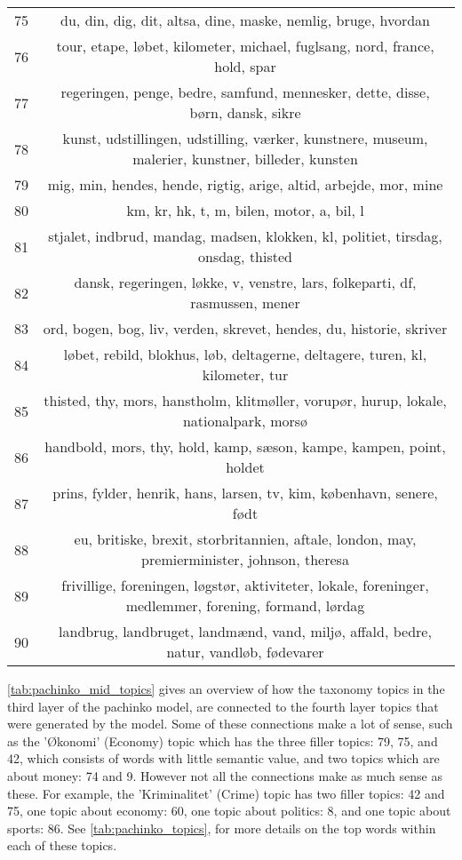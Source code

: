 \begin{longtable}[c]{c | c}
		75 & du, din, dig, dit, altsa, dine, maske, nemlig, bruge, hvordan \\
		76 & tour, etape, løbet, kilometer, michael, fuglsang, nord, france, hold, spar \\
		77 & regeringen, penge, bedre, samfund, mennesker, dette, disse, børn, dansk, sikre \\
		78 & kunst, udstillingen, udstilling, værker, kunstnere, museum, malerier, kunstner, billeder, kunsten \\
		79 & mig, min, hendes, hende, rigtig, arige, altid, arbejde, mor, mine \\
		80 & km, kr, hk, t, m, bilen, motor, a, bil, l \\
		81 & stjalet, indbrud, mandag, madsen, klokken, kl, politiet, tirsdag, onsdag, thisted \\
		82 & dansk, regeringen, løkke, v, venstre, lars, folkeparti, df, rasmussen, mener \\
		83 & ord, bogen, bog, liv, verden, skrevet, hendes, du, historie, skriver \\
		84 & løbet, rebild, blokhus, løb, deltagerne, deltagere, turen, kl, kilometer, tur \\
		85 & thisted, thy, mors, hanstholm, klitmøller, vorupør, hurup, lokale, nationalpark, morsø \\
		86 & handbold, mors, thy, hold, kamp, sæson, kampe, kampen, point, holdet \\
		87 & prins, fylder, henrik, hans, larsen, tv, kim, københavn, senere, født \\
		88 & eu, britiske, brexit, storbritannien, aftale, london, may, premierminister, johnson, theresa \\
		89 & frivillige, foreningen, løgstør, aktiviteter, lokale, foreninger, medlemmer, forening, formand, lørdag \\
		90 & landbrug, landbruget, landmænd, vand, miljø, affald, bedre, natur, vandløb, fødevarer \\
\end{longtable}

\autoref{tab:pachinko_mid_topics} gives an overview of how the taxonomy topics in the third layer of the pachinko model, are connected to the fourth layer topics that were generated by the model.
Some of these connections make a lot of sense, such as the 'Økonomi' (Economy) topic which has the three filler topics: 79, 75, and 42, which consists of words with little semantic value, and two topics which are about money: 74 and 9.
However not all the connections make as much sense as these. 
For example, the 'Kriminalitet' (Crime) topic has two filler topics: 42 and 75, one topic about economy: 60, one topic about politics: 8, and one topic about sports: 86.
See \autoref{tab:pachinko_topics}, for more details on the top words within each of these topics.

